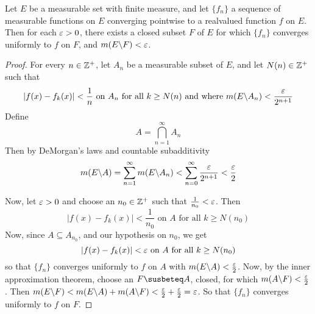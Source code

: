 \begin{theorem}\label{9.3.2}
    Let $E$ be a measurable set with finite measure, and let  $\{f_n\}$ a
    sequence of measurable functions on $E$ converging pointwise to a realvalued
    function  $f$ on $E$. Then for each $\varepsilon>0$, there exists a closed subset $F$
    of $E$ for which $\{f_n\}$ converges uniformly to $f$ on $F$, and
    $m(E \backslash F)<\varepsilon$.
\end{theorem}
\begin{proof}
    For every $n \in \mathbb{Z}^+$, let $A_n$ be a measurable subset of $E$, and let
    $N(n) \in \mathbb{Z}^+$ such that
    \begin{equation*}
        |f(x)-f_k(x)|<\frac{1}{n} \text{ on } A_n \text{ for all } k \geq N(n)
        \text{ and where } m(E \backslash A_n)<\frac{\varepsilon}{2^{n+1}}
    \end{equation*}
    Define
    \begin{equation*}
        A=\bigcap_{n=1}^\infty{A_n}
    \end{equation*}
    Then by DeMorgan's laws and countable subadditivity
    \begin{equation*}
        m(E \backslash A)=\sum_{n=1}^\infty{m(E \backslash A_n)}<
        \sum_{n=0}^\infty{\frac{\varepsilon}{2^{n+1}}}<\frac{\varepsilon}{2}
    \end{equation*}

    Now, let $\varepsilon>0$ and choose an $n_0 \in \mathbb{Z}^+$ such that $\frac{1}{n_0}<\varepsilon$.
    Then
    \begin{equation*}
        |f(x)-f_k(x)|<\frac{1}{n_0} \text{ on } A \text{ for all } k \geq N(n_0)
    \end{equation*}
    Now, since $A \subseteq A_{n_0}$, and our hypothesis on $n_0$, we get
    \begin{equation*}
        |f(x)-f_k(x)|<\varepsilon \text{ on } A \text{ for all } k \geq N(n_0)
    \end{equation*}
    so that $\{f_n\}$ converges uniformly to $f$ on  $A$ with
    $m(E \backslash A)<\frac{\varepsilon}{2}$. Now, by the inner approximation theorem,
    choose an $F \susbeteq A$, closed, for which  $m(A \backslash F)<\frac{\varepsilon}{2}$.
    Then
    $m(E \backslash F)<m(E \backslash A)+m(A \backslash F)<\frac{\varepsilon}{2}+\frac{\varepsilon}{2}=\varepsilon$. So
    that $\{f_n\}$ converges uniformly to $f$ on  $F$.
\end{proof}

